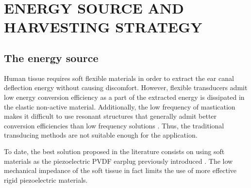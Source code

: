 \documentclass[3p,twocolumn,preprint]{elsarticle}
\begin{document}
\section{ENERGY SOURCE AND HARVESTING STRATEGY}
\label{sec:THE ENERGY SOURCE AND HARVESTING STRATEGY}
	\subsection{The energy source}	
	\label{The energy source}
Human tissue requires soft flexible materials in order to extract the ear canal deflection energy without causing discomfort. However, flexible transducers admit low energy conversion efficiency as a part of the extracted energy is dissipated in the elastic non-active material. Additionally, the low frequency of mastication makes it difficult to use resonant structures that generally admit better conversion efficiencies than low frequency solutions \cite{Ashraf2011}. Thus, the traditional transducing methods are not suitable enough for the application.

To date, the best solution proposed in the literature consists on using soft materials as the piezoelectric PVDF earplug previously introduced \cite{Delnavaz2013}. The low mechanical impedance of the soft tissue in fact limits the use of more effective rigid piezoelectric materials.
\end{document}
